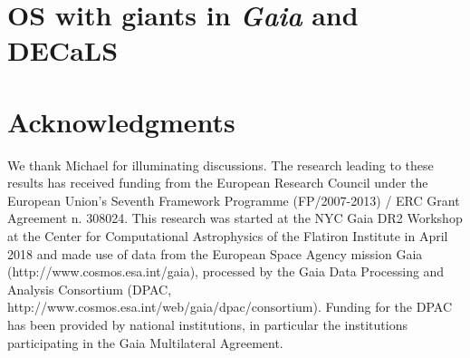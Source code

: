 \documentclass[a4paper,useAMS,usenatbib]{mnras}
\newcommand{\gaia}{\textit{Gaia} }
\begin{document}
\section{OS with giants in \gaia and DECaLS}


\section*{Acknowledgments}

We thank Michael for illuminating discussions. The research leading to
these results has received funding from the European Research Council
under the European Union's Seventh Framework Programme (FP/2007-2013)
/ ERC Grant Agreement n. 308024. This research was started at the NYC
Gaia DR2 Workshop at the Center for Computational Astrophysics of the
Flatiron Institute in April 2018 and made use of data from the
European Space Agency mission Gaia (http://www.cosmos.esa.int/gaia),
processed by the Gaia Data Processing and Analysis Consortium (DPAC,
http://www.cosmos.esa.int/web/gaia/dpac/consortium). Funding for the
DPAC has been provided by national institutions, in particular the
institutions participating in the Gaia Multilateral Agreement.



\label{lastpage}
\end{document}

